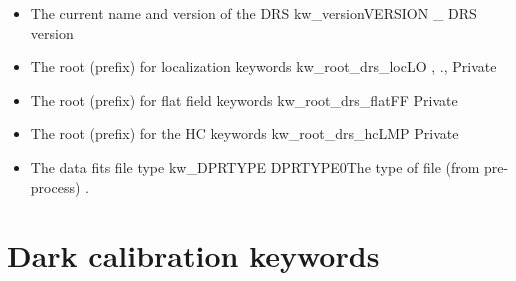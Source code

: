 \begin{itemize}

\item {} 
{The current name and version of the DRS}
{kw\_version}{VERSION}
{\_}
{DRS version}
{\AllRecipes}{\spirouKeywords}{\spirouKeywords}


\item {} 
{The root (prefix) for localization keywords}
{kw\_root\_drs\_loc}{LO}
{\calextractRAW, \spirouKeywords}{\spirouKeywords}{\calextractRAW.\progMAIN, \spirouKeywords}{Private}


\item {} 
{The root (prefix) for flat field keywords}
{kw\_root\_drs\_flat}{FF}
{\spirouKeywords}{\spirouKeywords}{\spirouKeywords}{Private}


\item {}
{The root (prefix) for the HC keywords}
{kw\_root\_drs\_hc}{LMP}
{\spirouKeywords}{\spirouKeywords}{\spirouKeywords}{Private}


\item {}
{The data fits file type}
{kw\_DPRTYPE}
{DPRTYPE}{0}{The type of file (from pre-process)}
{\calDARK}{\spirouKeywords}{\calDARK.\progMAIN}


\end{itemize}




\clearpage
\newpage
\section{Dark calibration keywords}
\label{ch:output_keywords:dark}

